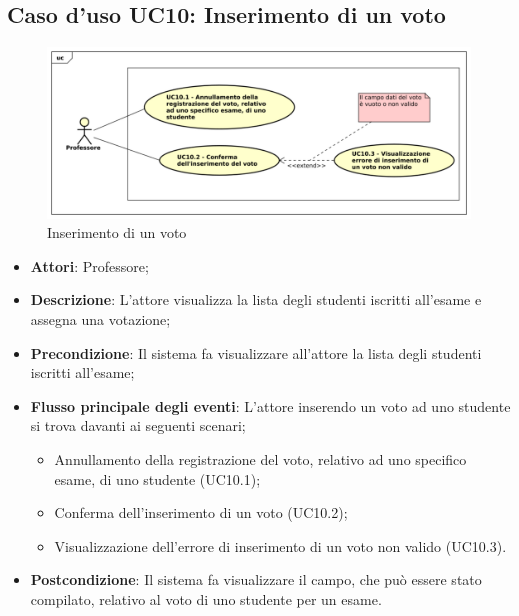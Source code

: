 \subsection{Caso d'uso \texorpdfstring{UC10}{UC10}: Inserimento di un voto }
\begin{figure} [H]
	\centering
	\includegraphics[scale=0.45]{./img/UC10.pdf}
	\caption{Inserimento di un voto }\label{}
\end{figure}
\begin{itemize}
	\item \textbf{Attori}: Professore;
	\item \textbf{Descrizione}: L'attore visualizza la lista degli studenti iscritti all'esame e assegna una votazione;
	\item \textbf{Precondizione}: Il sistema fa visualizzare all'attore la lista degli studenti iscritti all'esame;
	\item \textbf{Flusso principale degli eventi}: L'attore inserendo un voto ad uno studente si trova davanti ai seguenti scenari;
	\begin{itemize}
		\item Annullamento della registrazione del voto, relativo ad uno specifico esame, di uno studente (UC10.1);
		\item Conferma dell'inserimento di un voto (UC10.2);
		\item Visualizzazione dell'errore di inserimento di un voto non valido (UC10.3).
	\end{itemize}
	\item \textbf{Postcondizione}: Il sistema fa visualizzare il campo, che può essere stato compilato, relativo al voto di uno studente per un esame.
\end{itemize}
